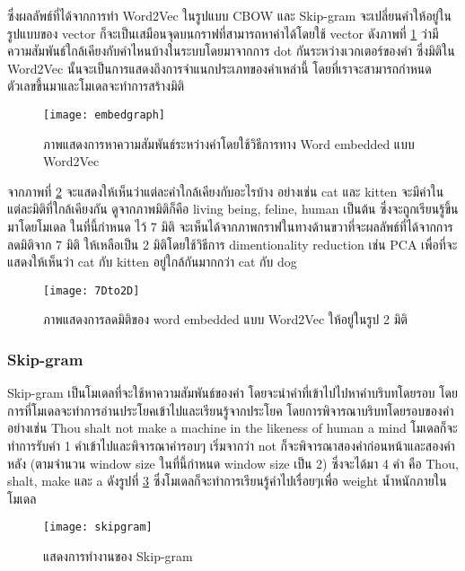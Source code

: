 ซึ่งผลลัพธ์ที่ได้จากการทำ Word2Vec ในรูปแบบ CBOW และ Skip-gram จะเปลี่ยนคำให้อยู่ในรูปแบบของ vector 
ก็จะเป็นเสมือนจุดบนกราฟที่สามารถหาค่าได้โดยใช้ vector ดังภาพที่ \ref{fig:embedgraph}
ว่ามีความสัมพันธ์ใกล้เคียงกับคำไหนบ้างในระบบโดยมาจากการ dot กันระหว่างเวกเตอร์ของคำ 
ซึ่งมิติใน Word2Vec นั้นจะเป็นการแสดงถึงการจำแนกประเภทของคำเหล่านี้ โดยที่เราจะสามารถกำหนดตัวเลขขึ้นมาและโมเดลจะทำการสร้างมิติ  

\begin{figure}[H]
    \centering
    \texttt{[image: embedgraph]}
    \caption{ภาพแสดงการหาความสัมพันธ์ระหว่างคำโดยใช้วิธีการทาง Word embedded แบบ Word2Vec \cite{lukkid}}\label{fig:embedgraph}
\end{figure}

จากภาพที่ \ref{fig:7Dto2D} จะแสดงให้เห็นว่าแต่ละคำใกล้เคียงกับอะไรบ้าง อย่างเช่น cat และ kitten
จะมีค่าในแต่ละมิติที่ใกล้เคียงกัน ดูจากภาพมิติก็คือ living being, feline, human เป็นต้น ซึ่งจะถูกเรียนรู้ขึ้นมาโดยโมเดล ในที่นี้กำหนด ไว้ 7 มิติ
จะเห็นได้จากภาพกราฟในทางด้านขวาที่จะผลลัพธ์ที่ได้จากการลดมิติจาก 7 มิติ ให้เหลือเป็น 2 มิติโดยใช้วิธีการ dimentionality reduction เช่น PCA\cite{PCA}\cite{PCAeng} 
เพื่อที่จะแสดงให้เห็นว่า cat กับ kitten อยู่ใกล้กันมากกว่า cat กับ dog

\begin{figure}[H]
    \centering
    \texttt{[image: 7Dto2D]}
    \caption{ภาพแสดงการลดมิติของ word embedded แบบ Word2Vec ให้อยู่ในรูป 2 มิติ\cite{sasiwut}}\label{fig:7Dto2D}
\end{figure}



\subsubsection{Skip-gram}

Skip-gram\cite{ichi} เป็นโมเดลที่จะใช้หาความสัมพันธ์ของคำ โดยจะนำคำที่เข้าไปไปหาคำบริบทโดยรอบ โดยการที่โมเดลจะทำการอ่านประโยคเข้าไปและเรียนรู้จากประโยค 
โดยการพิจารณาบริบทโดยรอบของคำ อย่างเช่น Thou shalt not make a machine in the likeness of human a mind โมเดลก็จะทำการรับคำ 
1 คำเข้าไปและพิจารณาคำรอบๆ เริ่มจากว่า not ก็จะพิจารณาสองคำก่อนหน้าและสองคำหลัง (ตามจำนวน window size ในที่นี้กำหนด window size เป็น 2) 
ซึ่งจะได้มา 4 คำ คือ Thou, shalt, make และ a ดังรูปที่ \ref{fig:skipgram} ซึ่งโมเดลก็จะทำการเรียนรู้คำไปเรื่อยๆเพื่อ weight น้ำหนักภายในโมเดล

\begin{figure}[H]
    \centering
    \texttt{[image: skipgram]}
    \caption{แสดงการทำงานของ Skip-gram \cite{ichi}}\label{fig:skipgram}
\end{figure}


